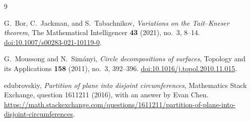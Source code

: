 \documentclass[11pt]{article}
\begin{document}
\begin{thebibliography}{9}

G.~Bor, C.~Jackman, and S.~Tabachnikov,
\emph{Variations on the Tait--Kneser theorem},
The Mathematical Intelligencer \textbf{43} (2021), no.~3, 8--14.
\href{https://doi.org/10.1007/s00283-021-10119-0}{doi:10.1007/s00283-021-10119-0}.

G.~Moussong and N.~Sim\'anyi,
\emph{Circle decompositions of surfaces},
Topology and its Applications \textbf{158} (2011), no.~3, 392--396.
\href{https://doi.org/10.1016/j.topol.2010.11.015}{doi:10.1016/j.topol.2010.11.015}.

edubrovskiy,
\emph{Partition of plane into disjoint circumferences},
Mathematics Stack Exchange, question 1611211 (2016), with an answer by Evan Chen.
\url{https://math.stackexchange.com/questions/1611211/partition-of-plane-into-disjoint-circumferences}.

\end{thebibliography}
\end{document}
